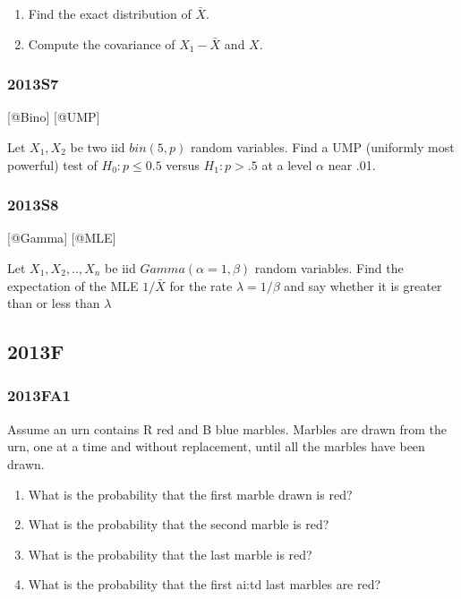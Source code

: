 \documentclass[6pt,Portrait]{article}
\begin{document}
\begin{enumerate}
\def\labelenumi{(\alph{enumi})}
\item
  Find the exact distribution of \(\bar X\).
\item
  Compute the covariance of \(X_1-\bar X\) and \(X\).
\end{enumerate}

\hypertarget{s7-2}{%
\subsubsection{2013S7}\label{s7-2}}

{[}@Bino{]} {[}@UMP{]}

Let \(X_1,X_2\) be two iid \(bin(5,p)\) random variables. Find a UMP
(uniformly most powerful) test of \(H_0: p\le 0.5\) versus \(H_1: p>.5\)
at a level \(\alpha\) near .01.

\hypertarget{s8-2}{%
\subsubsection{2013S8}\label{s8-2}}

{[}@Gamma{]} {[}@MLE{]}

Let \(X_1,X_2,..,X_{n}\) be iid \(Gamma(\alpha=1,\beta)\) random
variables. Find the expectation of the MLE \(1/\bar X\) for the rate
\(\lambda=1/\beta\) and say whether it is greater than or less than
\(\lambda\)

\hypertarget{f-8}{%
\subsection{2013F}\label{f-8}}

\hypertarget{fa1-2}{%
\subsubsection{2013FA1}\label{fa1-2}}

Assume an urn contains R red and B blue marbles. Marbles are drawn from
the urn, one at a time and without replacement, until all the marbles
have been drawn.

\begin{enumerate}
\def\labelenumi{(\alph{enumi})}
\item
  What is the probability that the first marble drawn is red?
\item
  What is the probability that the second marble is red?
\item
  What is the probability that the last marble is red?
\item
  What is the probability that the first ai:td last marbles are red?
\end{enumerate}
\end{document}
